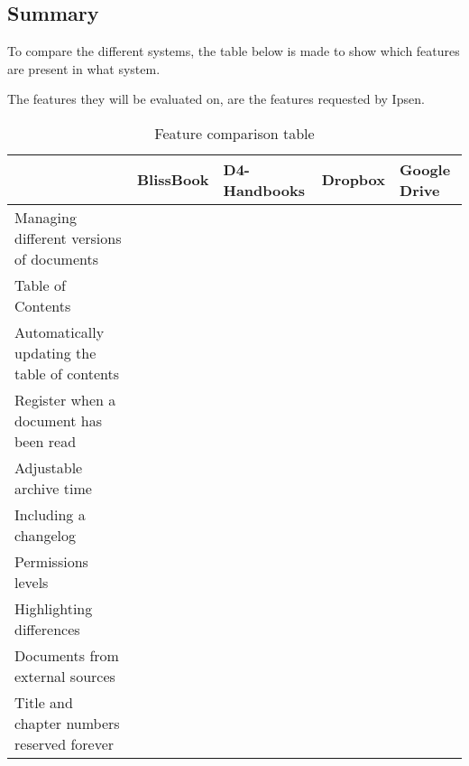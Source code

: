 \subsection{Summary}
To compare the different systems, the table below is made to show which features are present in what system.

The features they will be evaluated on, are the features requested by Ipsen.

\begin{table}[H]
	\begin{center}
		\begin{tabular}{| m{5cm}|m{1.6cm}|m{2cm}|m{1.5cm}|m{1.2cm}|}
			\hline
			& BlissBook  & D4-Handbooks & Dropbox & Google \newline Drive \\
			\hline
			Managing different versions of documents & \checkmark &  &  & \\
			\hline
			Table of Contents & \checkmark & \checkmark  & & \\
			\hline
			Automatically updating the table of contents & \checkmark & \checkmark  & \checkmark & \checkmark \\
			\hline
			Register when a document has been read & \checkmark & \checkmark &  & \\
			\hline
			Adjustable archive time &  &  &  & \\
			\hline
			Including a changelog & \checkmark & \checkmark  & \checkmark & \checkmark \\
			\hline
			Permissions levels & \checkmark &  & \checkmark & \checkmark \\
			\hline
			Highlighting differences & \checkmark &  &  & \\
			\hline
			Documents from external \newline sources &  &  & \checkmark & \checkmark \\
			\hline
			Title and chapter numbers \newline reserved forever &  &  &  & \\
			\hline
		\end{tabular}
		\caption{Feature comparison table}\label{tab:Exsisting}
	\end{center}
\end{table}

